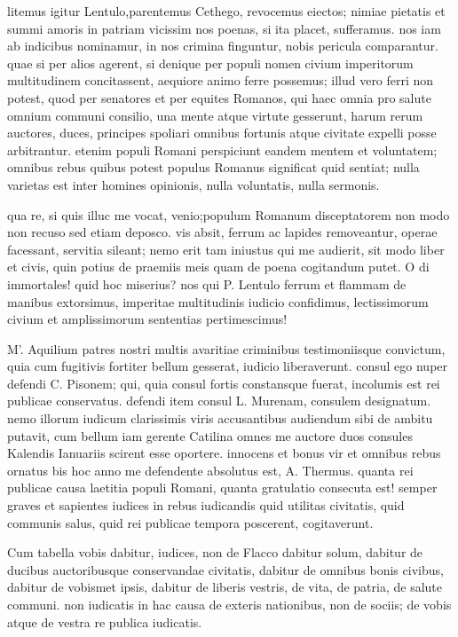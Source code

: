  litemus igitur Lentulo,parentemus Cethego, revocemus eiectos; nimiae pietatis et summi amoris in patriam vicissim nos poenas, si ita placet, sufferamus. nos iam ab indicibus nominamur, in nos crimina finguntur, nobis pericula comparantur. quae si per alios agerent, si denique per populi nomen civium imperitorum multitudinem concitassent, aequiore animo ferre possemus; illud vero ferri non potest, quod per senatores et per equites Romanos, qui haec omnia pro salute omnium communi consilio, una mente atque virtute gesserunt, harum rerum auctores, duces, principes spoliari omnibus fortunis atque civitate expelli posse arbitrantur. etenim populi Romani perspiciunt eandem mentem et voluntatem; omnibus rebus quibus potest populus Romanus significat quid sentiat; nulla varietas est inter homines opinionis, nulla voluntatis, nulla sermonis.

 qua re, si quis illuc me vocat, venio;populum Romanum disceptatorem non modo non recuso sed etiam deposco. vis absit, ferrum ac lapides removeantur, operae facessant, servitia sileant; nemo erit tam iniustus qui me audierit, sit modo liber et civis, quin potius de praemiis meis quam de poena cogitandum putet. O di immortales! quid hoc miserius? nos qui P. Lentulo ferrum et flammam de manibus extorsimus, imperitae multitudinis iudicio confidimus, lectissimorum civium et amplissimorum sententias pertimescimus!

 M'. Aquilium patres nostri multis avaritiae criminibus testimoniisque convictum, quia cum fugitivis fortiter bellum gesserat, iudicio liberaverunt. consul ego nuper defendi C. Pisonem; qui, quia consul fortis constansque fuerat, incolumis est rei publicae conservatus. defendi item consul L. Murenam, consulem designatum. nemo illorum iudicum clarissimis viris accusantibus audiendum sibi de ambitu putavit, cum bellum iam gerente Catilina omnes me auctore duos consules Kalendis Ianuariis scirent esse oportere. innocens et bonus vir et omnibus rebus ornatus bis hoc anno me defendente absolutus est, A. Thermus. quanta rei publicae causa laetitia populi Romani, quanta gratulatio consecuta est! semper graves et sapientes iudices in rebus iudicandis quid utilitas civitatis, quid communis salus, quid rei publicae tempora poscerent, cogitaverunt.

 Cum tabella vobis dabitur, iudices, non de Flacco dabitur solum, dabitur de ducibus auctoribusque conservandae civitatis, dabitur de omnibus bonis civibus, dabitur de vobismet ipsis, dabitur de liberis vestris, de vita, de patria, de salute communi. non iudicatis in hac causa de exteris nationibus, non de sociis; de vobis atque de vestra re publica iudicatis.

